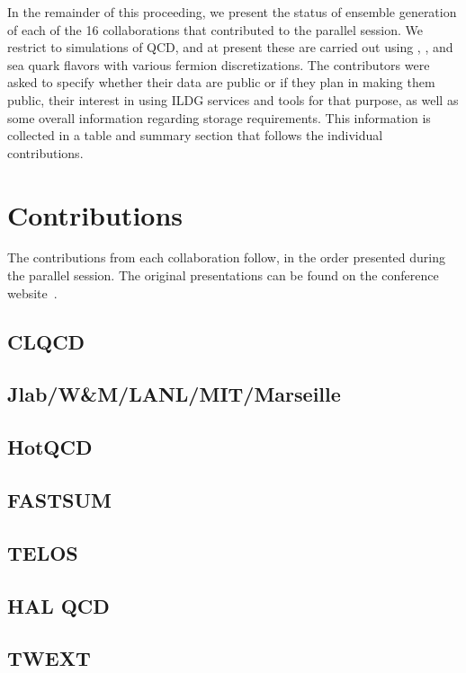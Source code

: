 \documentclass[a4paper,11pt]{article}
\begin{document}
In the remainder of this proceeding, we present the status of ensemble
generation of each of the 16 collaborations that contributed to the
parallel session. We restrict to simulations of QCD, and at present
these are carried out using , , and
 sea quark flavors with various fermion
discretizations. The contributors were asked to specify whether their
data are public or if they plan in making them public, their interest
in using ILDG services and tools for that purpose, as well as some
overall information regarding storage requirements. This information
is collected in a table and summary section that follows the
individual contributions.

\section{Contributions}
The contributions from each collaboration follow, in the order
presented during the parallel session. The original presentations can
be found on the conference website~\cite{parallel-session}.

\newpage
\subsection{CLQCD}

\subsection{Jlab/W\&M/LANL/MIT/Marseille}

\subsection{HotQCD}

\subsection{FASTSUM}

\subsection{TELOS}

\subsection{HAL QCD}

\subsection{TWEXT}
\end{document}

